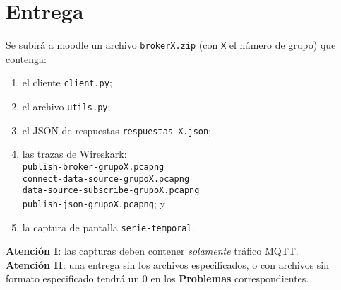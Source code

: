 \documentclass{upmassignment}
\begin{document}
\section*{Entrega}
\noindent Se subirá a moodle un archivo
\texttt{brokerX.zip}
(con \texttt{X} el número de grupo)
que contenga:
\begin{enumerate}
    \item el cliente \texttt{client.py};
    \item el archivo \texttt{utils.py};
    \item el JSON de respuestas \texttt{respuestas-X.json};
    \item las trazas de Wireskark:\\
          \texttt{publish-broker-grupoX.pcapng}\\
        \texttt{connect-data-source-grupoX.pcapng}\\
        \texttt{data-source-subscribe-grupoX.pcapng}\\
        \texttt{publish-json-grupoX.pcapng}; y
    \item la captura de pantalla 
        \texttt{serie-temporal}.
\end{enumerate}

\begin{tcolorbox}
    \textbf{Atención I}: las capturas
    deben contener
    \emph{solamente} tráfico MQTT.\\
    \textbf{Atención II}: una entrega
    sin los archivos especificados,
    o con archivos sin formato especificado
    tendrá un 0 en los \textbf{Problemas}
    correspondientes.
\end{tcolorbox}
\end{document}
